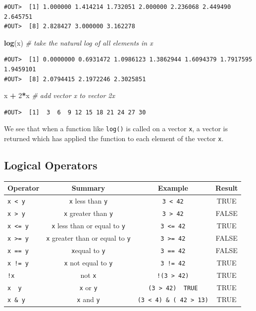 \documentclass[]{book}
\newenvironment{Shaded}{\begin{snugshade}}{\end{snugshade}}
\newcommand{\KeywordTok}[1]{\textcolor[rgb]{0.13,0.29,0.53}{\textbf{#1}}}
\newcommand{\DecValTok}[1]{\textcolor[rgb]{0.00,0.00,0.81}{#1}}
\newcommand{\StringTok}[1]{\textcolor[rgb]{0.31,0.60,0.02}{#1}}
\newcommand{\CommentTok}[1]{\textcolor[rgb]{0.56,0.35,0.01}{\textit{#1}}}
\newcommand{\OperatorTok}[1]{\textcolor[rgb]{0.81,0.36,0.00}{\textbf{#1}}}
\newcommand{\NormalTok}[1]{#1}
\theoremstyle{definition}
\theoremstyle{definition}
\theoremstyle{definition}
\theoremstyle{remark}
\begin{document}
\begin{verbatim}
#OUT>  [1] 1.000000 1.414214 1.732051 2.000000 2.236068 2.449490 2.645751
#OUT>  [8] 2.828427 3.000000 3.162278
\end{verbatim}

\begin{Shaded}
\begin{Highlighting}[]
\KeywordTok{log}\NormalTok{(x)    }\CommentTok{# take the natural log of all elements in x}
\end{Highlighting}
\end{Shaded}

\begin{verbatim}
#OUT>  [1] 0.0000000 0.6931472 1.0986123 1.3862944 1.6094379 1.7917595 1.9459101
#OUT>  [8] 2.0794415 2.1972246 2.3025851
\end{verbatim}

\begin{Shaded}
\begin{Highlighting}[]
\NormalTok{x }\OperatorTok{+}\StringTok{ }\DecValTok{2}\OperatorTok{*}\NormalTok{x   }\CommentTok{# add vector x to vector 2x}
\end{Highlighting}
\end{Shaded}

\begin{verbatim}
#OUT>  [1]  3  6  9 12 15 18 21 24 27 30
\end{verbatim}

We see that when a function like \texttt{log()} is called on a vector
\texttt{x}, a vector is returned which has applied the function to each
element of the vector \texttt{x}.

\subsection{Logical Operators}\label{logical-operators}

\begin{longtable}[]{@{}lccc@{}}
\toprule
Operator & Summary & Example & Result\tabularnewline
\midrule
\endhead
\texttt{x\ \textless{}\ y} & \texttt{x} less than \texttt{y} &
\texttt{3\ \textless{}\ 42} & TRUE\tabularnewline
\texttt{x\ \textgreater{}\ y} & \texttt{x} greater than \texttt{y} &
\texttt{3\ \textgreater{}\ 42} & FALSE\tabularnewline
\texttt{x\ \textless{}=\ y} & \texttt{x} less than or equal to
\texttt{y} & \texttt{3\ \textless{}=\ 42} & TRUE\tabularnewline
\texttt{x\ \textgreater{}=\ y} & \texttt{x} greater than or equal to
\texttt{y} & \texttt{3\ \textgreater{}=\ 42} & FALSE\tabularnewline
\texttt{x\ ==\ y} & \texttt{x}equal to \texttt{y} & \texttt{3\ ==\ 42} &
FALSE\tabularnewline
\texttt{x\ !=\ y} & \texttt{x} not equal to \texttt{y} &
\texttt{3\ !=\ 42} & TRUE\tabularnewline
\texttt{!x} & not \texttt{x} & \texttt{!(3\ \textgreater{}\ 42)} &
TRUE\tabularnewline
\texttt{x\ \textbar{}\ y} & \texttt{x} or \texttt{y} &
\texttt{(3\ \textgreater{}\ 42)\ \textbar{}\ TRUE} & TRUE\tabularnewline
\texttt{x\ \&\ y} & \texttt{x} and \texttt{y} &
\texttt{(3\ \textless{}\ 4)\ \&\ (\ 42\ \textgreater{}\ 13)} &
TRUE\tabularnewline
\bottomrule
\end{longtable}
\end{document}
